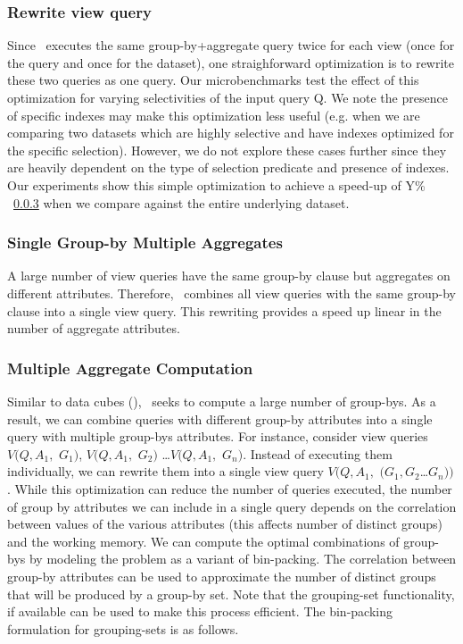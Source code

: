 \subsubsection{Rewrite view query}
Since \SeeDB\ executes the same group-by+aggregate query twice for each view
(once for the query and once for the dataset), one straighforward optimization
is to rewrite these two queries as one query. Our microbenchmarks test the
effect of this optimization for varying selectivities of the input query Q. We
note the presence of specific indexes may make this optimization less useful
(e.g. when we are comparing two datasets which are highly selective and have
indexes optimized for the specific selection). However, we do not explore these
cases further since they are heavily dependent on the type of selection
predicate and presence of indexes. Our experiments show this simple
optimization to achieve a speed-up of Y\% ~\ref{} when we compare against the
entire underlying dataset.
  
\subsubsection{Single Group-by Multiple Aggregates}
A large number of view queries have the same group-by clause but aggregates on
different attributes. Therefore, \SeeDB\ combines all view queries with the same
group-by clause into a single view query. This rewriting provides a speed up
linear in the number of aggregate attributes.
  
\subsubsection{Multiple Aggregate Computation}
Similar to data cubes (\cite{}), \SeeDB\ seeks to compute a large number of
group-bys. As a result, we can combine queries with different group-by
attributes into a single query with multiple group-bys attributes. For instance,
consider view queries $V(Q, A_1,$ $G_1)$, $V(Q, A_1,$ $G_2)$ \ldots $V(Q, A_1,$
$G_n)$. Instead of executing them individually, we can rewrite them into a
single view query $V(Q, A_1,$ $(G_1, G_2$\ldots $G_n))$. While this optimization
can reduce the number of queries executed, the number of group by attributes we
can include in a single query depends on the correlation between values of the
various attributes (this affects number of distinct groups) and the working
memory. We can compute the optimal combinations of group-bys by modeling the
problem as a variant of bin-packing. The correlation between group-by attributes
can be used to approximate the number of distinct groups that will be produced
by a group-by set. Note that the grouping-set functionality, if available can be
used to make this process efficient. The bin-packing formulation for
grouping-sets is as follows.

